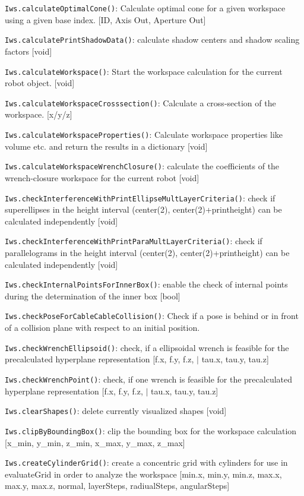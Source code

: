 \documentclass[11pt,a4paper,onepage,openany]{book}
\begin{document}
\texttt{Iws.calculateOptimalCone()}: Calculate optimal cone for a given workspace using a given base index. [ID, Axis Out, Aperture Out]

\texttt{Iws.calculatePrintShadowData()}: calculate shadow centers and shadow scaling factors [void]

\texttt{Iws.calculateWorkspace()}: Start the workspace calculation for the current robot object. [void]

\texttt{Iws.calculateWorkspaceCrosssection()}: Calculate a cross-section of the workspace. [x/y/z]

\texttt{Iws.calculateWorkspaceProperties()}: Calculate workspace properties like volume etc. and return the results in a dictionary [void]

\texttt{Iws.calculateWorkspaceWrenchClosure()}: calculate the coefficients of the wrench-closure workspace for the current robot [void]

\texttt{Iws.checkInterferenceWithPrintEllipseMultLayerCriteria()}: check if superellipses in the height interval (center(2), center(2)+printheight) can be calculated independently  [void]

\texttt{Iws.checkInterferenceWithPrintParaMultLayerCriteria()}: check if parallelograms in the height interval (center(2), center(2)+printheight) can be calculated independently  [void]

\texttt{Iws.checkInternalPointsForInnerBox()}: enable the check of internal points during the determination of the inner box [bool]

\texttt{Iws.checkPoseForCableCableCollision()}: Check if a pose is behind or in front of a collision plane with respect to an initial position.

\texttt{Iws.checkWrenchEllipsoid()}: check, if a ellipsoidal wrench is feasible for the precalculated hyperplane representation [f.x, f.y, f.z, $|$ tau.x, tau.y, tau.z]

\texttt{Iws.checkWrenchPoint()}: check, if one wrench is feasible for the precalculated hyperplane representation [f.x, f.y, f.z, $|$ tau.x, tau.y, tau.z]

\texttt{Iws.clearShapes()}: delete currently visualized shapes [void]

\texttt{Iws.clipByBoundingBox()}: clip the bounding box for the workspace calculation [x\_min, y\_min, z\_min, x\_max, y\_max, z\_max]

\texttt{Iws.createCylinderGrid()}: create a concentric grid with cylinders for use in evaluateGrid in order to analyze the workspace [min.x, min.y, min.z, max.x, max.y, max.z, normal, layerSteps, radiualSteps, angularSteps]
\end{document}
